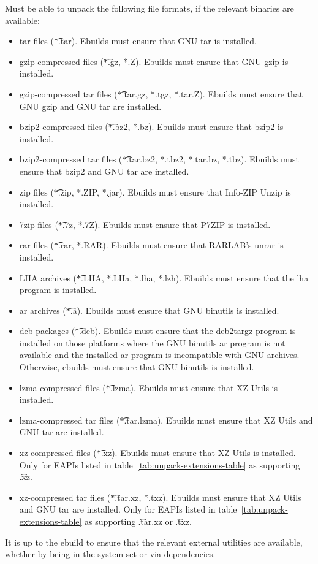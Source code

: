 \begin{description}
     Must be able to unpack the following file formats, if the
    relevant binaries are available:
    \begin{itemize}
    \item tar files (\t{*.tar}). Ebuilds must ensure that GNU tar is installed.
    \item gzip-compressed files (\t{*.gz, *.Z}). Ebuilds must ensure that GNU gzip is installed.
    \item gzip-compressed tar files (\t{*.tar.gz, *.tgz, *.tar.Z}). Ebuilds must ensure that
    GNU gzip and GNU tar are installed.
    \item bzip2-compressed files (\t{*.bz2, *.bz}). Ebuilds must ensure that bzip2 is installed.
    \item bzip2-compressed tar files (\t{*.tar.bz2, *.tbz2, *.tar.bz, *.tbz}). Ebuilds must ensure
    that bzip2 and GNU tar are installed.
    \item zip files (\t{*.zip, *.ZIP, *.jar}). Ebuilds must ensure that Info-ZIP Unzip is installed.
    \item 7zip files (\t{*.7z, *.7Z}). Ebuilds must ensure that P7ZIP is installed.
    \item rar files (\t{*.rar, *.RAR}). Ebuilds must ensure that RARLAB's unrar is installed.
    \item LHA archives (\t{*.LHA, *.LHa, *.lha, *.lzh}). Ebuilds must ensure that the lha program is
    installed.
    \item ar archives (\t{*.a}). Ebuilds must ensure that GNU binutils is installed.
    \item deb packages (\t{*.deb}). Ebuilds must ensure that the deb2targz program is installed on
    those platforms where the GNU binutils ar program is not available and the installed ar program is
    incompatible with GNU archives. Otherwise, ebuilds must ensure that GNU binutils is installed.
    \item lzma-compressed files (\t{*.lzma}). Ebuilds must ensure that XZ Utils is installed.
    \item lzma-compressed tar files (\t{*.tar.lzma}). Ebuilds must ensure that XZ Utils and GNU tar
        are installed.
    \item xz-compressed files (\t{*.xz}). Ebuilds must ensure that XZ Utils is installed. Only for
        EAPIs listed in table~\ref{tab:unpack-extensions-table} as supporting \t{.xz}.
    \item xz-compressed tar files (\t{*.tar.xz, *.txz}). Ebuilds must ensure that XZ Utils and
        GNU tar are installed. Only for EAPIs listed in table~\ref{tab:unpack-extensions-table} as
        supporting \t{.tar.xz} or \t{.txz}.
    \end{itemize}
    It is up to the ebuild to ensure that the relevant external utilities are available, whether by
    being in the system set or via dependencies.


\end{description}
